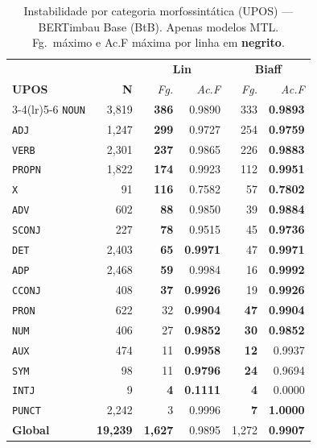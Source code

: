 \clearpage
\begin{table}[p]
\centering
\caption{Instabilidade por categoria morfossint\'atica (UPOS) --- BERTimbau Base (BtB).
Apenas modelos MTL. Fg.\ m\'aximo e Ac.F m\'axima por linha em \textbf{negrito}.}
\label{tab:instab-btb-upos}
\begingroup
\small\setlength{\tabcolsep}{6pt}\renewcommand{\arraystretch}{1.2}%
\begin{tabular}{l r| r r| r r}
\toprule
\multicolumn{2}{c|}{}
  & \multicolumn{2}{c|}{\textbf{Lin}}
  & \multicolumn{2}{c}{\textbf{Biaff}} \\
\textbf{UPOS} & \textbf{N}
  & \textit{Fg.} & \textit{Ac.F}
  & \textit{Fg.} & \textit{Ac.F} \\
\cmidrule(lr){3-4}\cmidrule(lr){5-6}
  \texttt{NOUN} & 3,819 & \textbf{386} & 0.9890 & 333 & \textbf{0.9893} \\
  \texttt{ADJ} & 1,247 & \textbf{299} & 0.9727 & 254 & \textbf{0.9759} \\
  \texttt{VERB} & 2,301 & \textbf{237} & 0.9865 & 226 & \textbf{0.9883} \\
  \texttt{PROPN} & 1,822 & \textbf{174} & 0.9923 & 112 & \textbf{0.9951} \\
  \texttt{X} & 91 & \textbf{116} & 0.7582 & 57 & \textbf{0.7802} \\
  \texttt{ADV} & 602 & \textbf{88} & 0.9850 & 39 & \textbf{0.9884} \\
  \texttt{SCONJ} & 227 & \textbf{78} & 0.9515 & 45 & \textbf{0.9736} \\
  \texttt{DET} & 2,403 & \textbf{65} & \textbf{0.9971} & 47 & \textbf{0.9971} \\
  \texttt{ADP} & 2,468 & \textbf{59} & 0.9984 & 16 & \textbf{0.9992} \\
  \texttt{CCONJ} & 408 & \textbf{37} & \textbf{0.9926} & 19 & \textbf{0.9926} \\
  \texttt{PRON} & 622 & 32 & \textbf{0.9904} & \textbf{47} & \textbf{0.9904} \\
  \texttt{NUM} & 406 & 27 & \textbf{0.9852} & \textbf{30} & \textbf{0.9852} \\
  \texttt{AUX} & 474 & 11 & \textbf{0.9958} & \textbf{12} & 0.9937 \\
  \texttt{SYM} & 98 & 11 & \textbf{0.9796} & \textbf{24} & 0.9694 \\
  \texttt{INTJ} & 9 & \textbf{4} & \textbf{0.1111} & \textbf{4} & 0.0000 \\
  \texttt{PUNCT} & 2,242 & 3 & 0.9996 & \textbf{7} & \textbf{1.0000} \\
\midrule
  \textbf{Global} & \textbf{19,239} & \textbf{1,627} & 0.9895 & 1,272 & \textbf{0.9907} \\
\bottomrule
\end{tabular}
\endgroup
\instablegendaMTL
\end{table}

